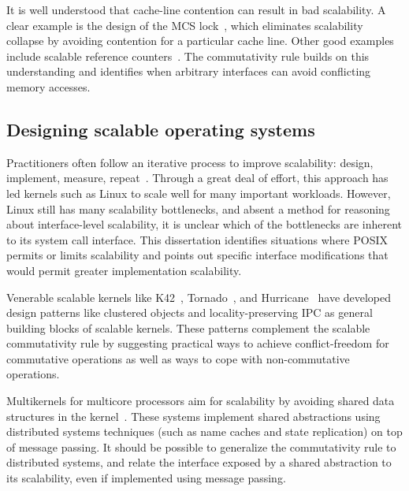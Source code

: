 
It is well understood that cache-line
contention can result in bad scalability. A clear example is the design of
the MCS lock~\cite{MCS}, which eliminates scalability collapse by avoiding
contention for a particular cache line.  Other good examples include
scalable reference counters~\cite{approx:counter,snzi:podc}.
%
The commutativity rule builds on this understanding and identifies when
arbitrary interfaces can avoid conflicting memory accesses.

\subsection{Designing scalable operating systems}

Practitioners often follow an iterative process to
improve scalability: design, implement, measure, 
repeat~\cite{cacm-real-world}.
%
Through a great deal of effort,
this approach has led kernels such as Linux to scale well
for many important workloads. However, Linux still has many
scalability bottlenecks, and absent a method for reasoning about
interface-level scalability, it is unclear which of the bottlenecks
are inherent to its system call interface.  This dissertation
identifies situations
where POSIX permits or limits scalability and points out specific interface
modifications that would permit greater implementation scalability.

Venerable scalable kernels like K42~\cite{appavoo:k42},
Tornado~\cite{tornado}, and Hurricane~\cite{hurricane} have developed
design patterns like clustered objects and locality-preserving IPC as
general building blocks of scalable kernels.  These patterns
complement the scalable commutativity rule by suggesting practical
ways to achieve conflict-freedom for commutative operations as well as
ways to cope with non-commutative operations.

Multikernels for multicore processors aim for scalability by avoiding shared
data structures in the kernel~\cite{barrelfish:sosp,wentzlaff:fos}.  These
systems implement shared abstractions using distributed systems techniques (such
as name caches and state replication) on top of message passing.  It should be
possible to generalize the commutativity rule to distributed systems, and relate
the interface exposed by a shared abstraction to its scalability, even if
implemented using message passing.


